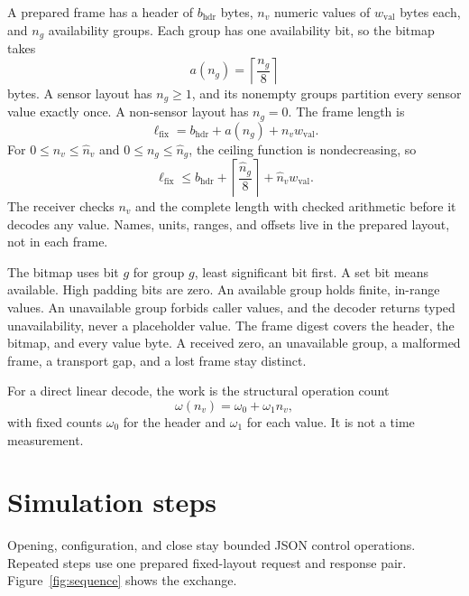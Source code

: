 \documentclass[11pt,a4paper]{article}
\theoremstyle{definition}
\begin{document}
A prepared frame has a header of $b_{\mathrm{hdr}}$ bytes, $n_v$ numeric values of
$w_{\mathrm{val}}$ bytes each, and $n_g$ availability groups. Each group has one
availability bit, so the bitmap takes
\begin{equation}\label{eq:bitmap-bytes}
a(n_g)=\left\lceil\frac{n_g}{8}\right\rceil
\end{equation}
bytes. A sensor layout has $n_g\geq1$, and its nonempty groups partition every sensor
value exactly once. A non-sensor layout has $n_g=0$. The frame length is
\begin{equation}\label{eq:frame-length}
\ell_{\mathrm{fix}}=b_{\mathrm{hdr}}+a(n_g)+n_vw_{\mathrm{val}}.
\end{equation}
For $0\leq n_v\leq\hat n_v$ and $0\leq n_g\leq\hat n_g$, the ceiling function is
nondecreasing, so
\begin{equation}\label{eq:frame-bound}
\ell_{\mathrm{fix}}\leq b_{\mathrm{hdr}}+\left\lceil\frac{\hat n_g}{8}\right\rceil
+\hat n_vw_{\mathrm{val}}.
\end{equation}
The receiver checks $n_v$ and the complete length with checked arithmetic before it
decodes any value. Names, units, ranges, and offsets live in the prepared layout, not
in each frame.

The bitmap uses bit $g$ for group $g$, least significant bit first. A set bit means
available. High padding bits are zero. An available group holds finite, in-range
values. An unavailable group forbids caller values, and the decoder returns typed
unavailability, never a placeholder value. The frame digest covers the header, the
bitmap, and every value byte. A received zero, an unavailable group, a malformed frame,
a transport gap, and a lost frame stay distinct.

For a direct linear decode, the work is the structural operation count
\begin{equation}\label{eq:codec-work}
\omega(n_v)=\omega_0+\omega_1n_v,
\end{equation}
with fixed counts $\omega_0$ for the header and $\omega_1$ for each value. It is not a
time measurement.

\section{Simulation steps}


Opening, configuration, and close stay bounded JSON control operations. Repeated steps
use one prepared fixed-layout request and response pair. Figure~\ref{fig:sequence}
shows the exchange.
\end{document}
